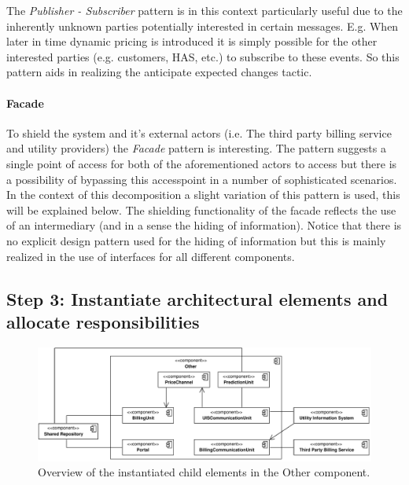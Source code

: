 \npar The \emph{Publisher - Subscriber} pattern is in this context particularly useful due to
the inherently unknown parties potentially interested in certain messages. E.g. When
later in time dynamic pricing is introduced it is simply possible for the other
interested parties (e.g. customers, HAS, etc.) to subscribe to these events. So
this pattern aids in realizing the anticipate expected changes tactic.

\paragraph{Facade}

\npar To shield the system and it's external actors (i.e. The third party
billing service and utility providers) the \emph{Facade} pattern is interesting.
The pattern suggests a single point of access for both of the aforementioned
actors to access but there is a possibility of bypassing this accesspoint in a
number of sophisticated scenarios. In the context of this decomposition a slight
variation of this pattern is used, this will be explained below. The shielding
functionality of the facade reflects the use of an intermediary (and in a sense
the hiding of information). Notice that there is no explicit design pattern used
for the hiding of information but this is mainly realized in the use of
interfaces for all different components.

\subsection{Step 3: Instantiate architectural elements and allocate responsibilities}
\label{add:it10/elements}

\begin{figure}[H]
	\begin{centering}
		\includegraphics[width=\textwidth]{figs/add-it10-elements.pdf}
		\caption{Overview of the instantiated child elements in the Other component.}
		\label{fig:add/it10/decomposition}
	\end{centering}
\end{figure}

